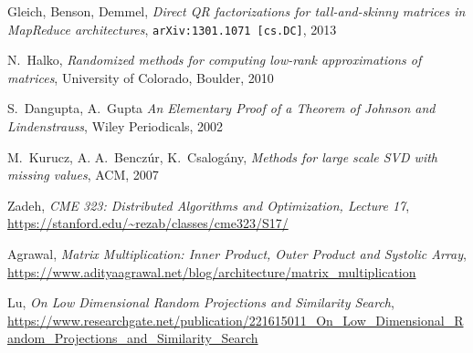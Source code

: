 \documentclass{article}
\begin{document}
  

\begin{thebibliography}{1}

Gleich, Benson, Demmel, \emph{Direct QR factorizations for tall-and-skinny
  matrices in MapReduce architectures}, {\tt arXiv:1301.1071 [cs.DC]}, 2013

N.~Halko, \emph{Randomized methods for computing low-rank approximations of
  matrices}, University of Colorado, Boulder, 2010

S.~Dangupta, A.~Gupta \emph{An Elementary Proof of a Theorem of Johnson and
  Lindenstrauss}, Wiley Periodicals, 2002

M.~Kurucz, A. A.~Benczúr, K.~Csalogány, \emph{Methods for large scale SVD with
missing values}, ACM, 2007

Zadeh, \emph{CME 323: Distributed Algorithms and Optimization, Lecture 17}, 
\url{https://stanford.edu/~rezab/classes/cme323/S17/}

Agrawal, \emph{Matrix Multiplication: Inner Product, Outer Product and Systolic Array},
\url{https://www.adityaagrawal.net/blog/architecture/matrix_multiplication}

Lu, \emph{On Low Dimensional Random Projections and Similarity Search},
    \url{https://www.researchgate.net/publication/221615011_On_Low_Dimensional_Random_Projections_and_Similarity_Search}

\end{thebibliography}
\end{document}
